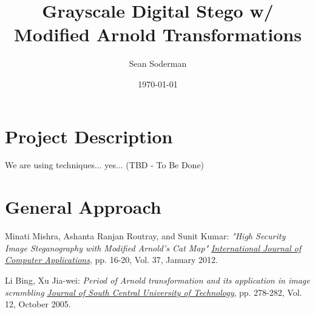 \documentclass{article}
\begin{document}
\title{Grayscale Digital Stego w/ Modified Arnold Transformations}
\author{Sean Soderman}
\date{\today}
\maketitle

\section{Project Description}
We are using techniques... yes... (TBD - To Be Done)


\section{General Approach}

\begin{thebibliography}{9}
Minati Mishra, Ashanta Ranjan Routray, and Sunit Kumar:
\textit{"High Security Image Steganography with Modified Arnold's Cat Map"}
\textit{\underline{International Journal of Computer Applications}}, pp. 16-20,
Vol. 37, January 2012.

Li Bing, Xu Jia-wei:
\textit{Period of Arnold transformation and its application in image scrambling}
\textit{\underline{Journal of South Central University of Technology}}, pp. 278-282,
Vol. 12, October 2005.

\end{thebibliography}
\end{document}

